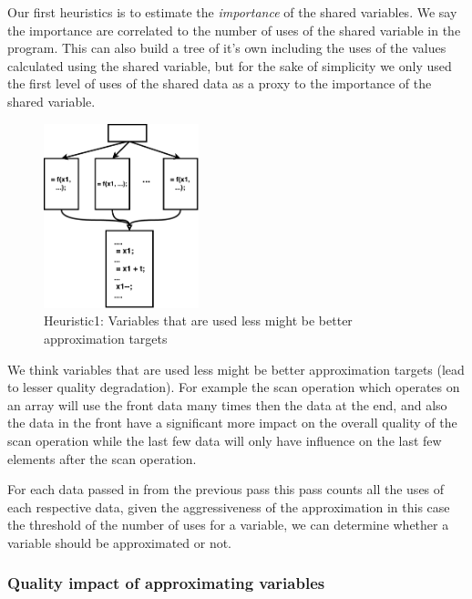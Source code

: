 \documentclass[12pt,conference]{IEEEtran}
\begin{document}
Our first heuristics is to estimate the \emph{importance} of 
the shared variables. We say the importance are correlated to 
the number of uses of the shared variable in the program. This
can also build a tree of it's own including the uses of the values
calculated using the shared variable, but for the sake of simplicity
we only used the first level of uses of the shared data as a proxy 
to the importance of the shared variable.
\begin{figure}[h]
    \centering
    \includegraphics[width=0.40\textwidth]{Heuristic1.pdf}
    \caption{Heuristic1: Variables that are used less might be better approximation targets}
    \label{fig:h1}
\end{figure}

We think variables that are used less might be better approximation 
targets (lead to lesser quality degradation). For example the scan
operation which operates on an array will use the front data many
times then the data at the end, and also the data in the front
have a significant more impact on the overall quality of the 
scan operation while the last few data will only have influence
on the last few elements after the scan operation.

For each data passed in from the previous pass this pass counts all 
the uses of each respective data, given the aggressiveness of 
the approximation in this case the threshold of the number of 
uses for a variable, we can determine whether a variable should 
be approximated or not.

\subsubsection{Quality impact of approximating variables}
\end{document}
